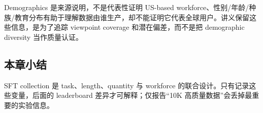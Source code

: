 
\begin{warningbox}{Demographics 是来源说明，不是代表性证明}
US-based workforce、性别/年龄/种族/教育分布有助于理解数据由谁生产，却不能证明它代表全球用户。讲义保留这些信息，是为了追踪 viewpoint coverage 和潜在偏差，而不是把 demographic diversity 当作质量认证。
\end{warningbox}


\subsection{本章小结}

SFT collection 是 task、length、quantity 与 workforce 的联合设计。只有记录这些变量，后面的 leaderboard 差异才可解释；仅报告“10K 高质量数据”会丢掉最重要的实验信息。


